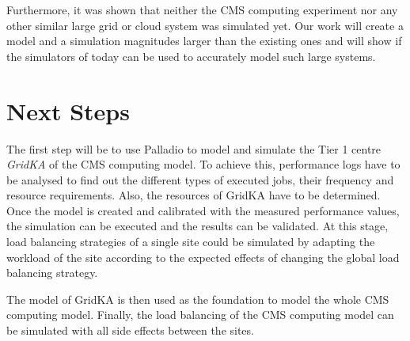 Furthermore, it was shown that neither the CMS computing experiment nor any other similar large grid or cloud system was simulated yet. Our work will create a model and a simulation magnitudes larger than the existing ones and will show if the simulators of today can be used to accurately model such large systems.

\chapter{Next Steps}
The first step will be to use Palladio to model and simulate the Tier 1 centre \textit{GridKA} of the CMS computing model. 
To achieve this, performance logs have to be analysed to find out the different types of executed jobs, 
their frequency and resource requirements. Also, the resources of GridKA have to be determined.
Once the model is created and calibrated with the measured performance values, the simulation can be executed and the results can be validated.
At this stage, load balancing strategies of a single site could be simulated by adapting the workload of the site according to the expected effects of changing the global load balancing strategy.

The model of GridKA is then used as the foundation to model the whole CMS computing model. Finally, the load balancing of the CMS computing model can be simulated with all side effects between the sites.

